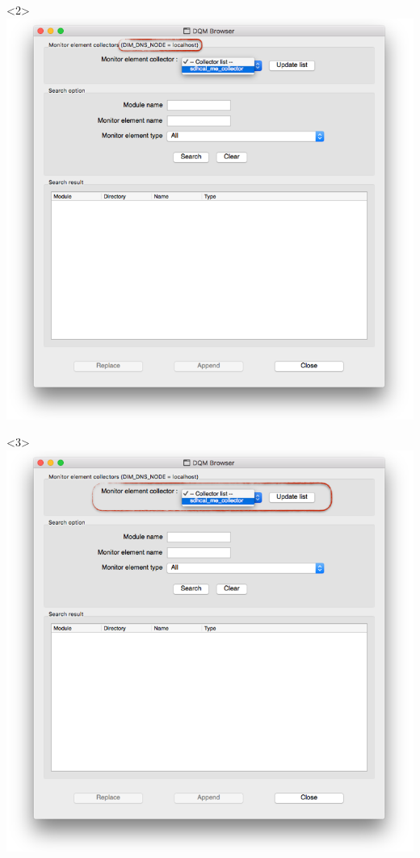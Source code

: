 \documentclass[8pt]{beamer}
\begin{document}
\begin{frame}
\begin{overlayarea}{\textwidth}{\textheight}
\begin{columns}
	     	       \begin{center}
        \begin{onlyenv}<2>\includegraphics[width=1.5\textwidth]{figs/Browser/Browser_DNSNode.png}\end{onlyenv}
         \begin{onlyenv}<3>\includegraphics[width=1.5\textwidth]{figs/Browser/Browser_MESelection}\end{onlyenv}

\end{center}
\end{columns}
\end{overlayarea}
\end{frame}
\end{document}
